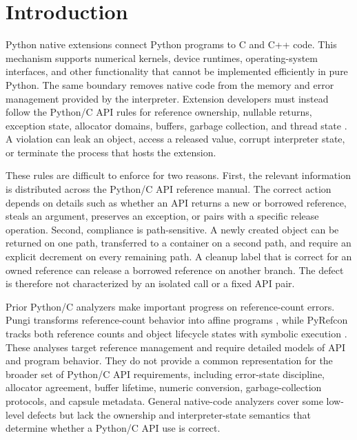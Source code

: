 \section{Introduction}
\label{sec:introduction}

Python native extensions connect Python programs to C and C++ code. This
mechanism supports numerical kernels, device runtimes, operating-system
interfaces, and other functionality that cannot be implemented efficiently in
pure Python. The same boundary removes native code from the memory and error
management provided by the interpreter. Extension developers must instead
follow the Python/C API rules for reference ownership, nullable returns,
exception state, allocator domains, buffers, garbage collection, and thread
state \cite{pythoncapi,hu2020pythoncapi}. A violation can leak an object, access
a released value, corrupt interpreter state, or terminate the process that
hosts the extension.

These rules are difficult to enforce for two reasons. First, the relevant
information is distributed across the Python/C API reference manual. The
correct action depends on details such as whether an API returns a new or
borrowed reference, steals an argument, preserves an exception, or pairs with
a specific release operation. Second, compliance is path-sensitive. A newly
created object can be returned on one path, transferred to a container on a
second path, and require an explicit decrement on every remaining path. A
cleanup label that is correct for an owned reference can release a borrowed
reference on another branch. The defect is therefore not characterized by an
isolated call or a fixed API pair.

Prior Python/C analyzers make important progress on reference-count errors.
Pungi transforms reference-count behavior into affine programs
\cite{pungi2014}, while PyRefcon tracks both reference counts and object
lifecycle states with symbolic execution \cite{pyrefcon2023}. These analyses
target reference management and require detailed models of API and program
behavior. They do not provide a common representation for the broader set of
Python/C API requirements, including error-state discipline, allocator
agreement, buffer lifetime, numeric conversion, garbage-collection protocols,
and capsule metadata. General native-code analyzers cover some low-level
defects but lack the ownership and interpreter-state semantics that determine
whether a Python/C API use is correct.

